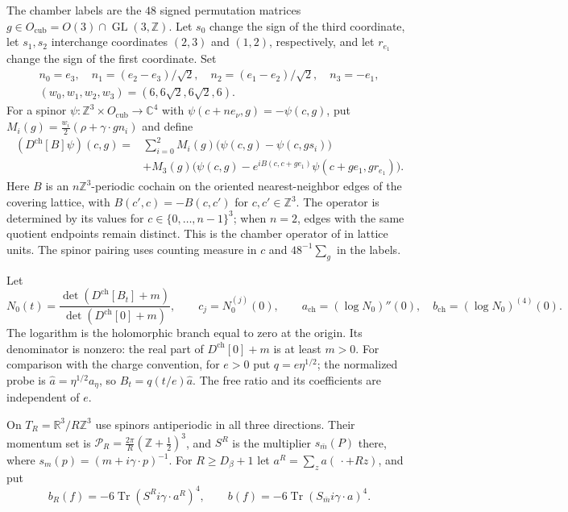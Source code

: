 \documentclass[11pt,letterpaper,reqno]{amsart}
\newcommand{\R}{\mathbb R}
\newcommand{\C}{\mathbb C}
\newcommand{\Z}{\mathbb Z}
\begin{document}
The chamber labels are the $48$ signed permutation matrices
$g\in O_{\mathrm{cub}}=O(3)\cap\operatorname{GL}(3,\Z)$.
Let $s_0$ change the sign of the third coordinate, let $s_1,s_2$
interchange coordinates $(2,3)$ and $(1,2)$, respectively, and let
$r_{e_1}$ change the sign of the first coordinate. Set
\begin{gather*}
 n_0=e_3,\quad n_1=(e_2-e_3)/\sqrt2,\quad
 n_2=(e_1-e_2)/\sqrt2,\quad n_3=-e_1,\\
 (w_0,w_1,w_2,w_3)=(6,6\sqrt2,6\sqrt2,6).
\end{gather*}
For a spinor $\psi:\Z^3\times O_{\mathrm{cub}}\to\C^4$ with
$\psi(c+ne_\nu,g)=-\psi(c,g)$, put
$M_i(g)=\frac{w_i}{2}(\rho+\gamma\cdot gn_i)$ and define
\begin{equation}\label{eq:prm-chamber-operator}
\begin{split}
 (D^{\mathrm{ch}}[B]\psi)(c,g)
 ={}&\sum_{i=0}^2M_i(g)\bigl(\psi(c,g)-\psi(c,gs_i)\bigr)\\
 &+M_3(g)\bigl(\psi(c,g)
       -e^{iB(c,c+ge_1)}\psi(c+ge_1,gr_{e_1})\bigr).
\end{split}
\end{equation}
Here $B$ is an $n\Z^3$-periodic cochain on the oriented nearest-neighbor
edges of the covering lattice, with $B(c',c)=-B(c,c')$ for
$c,c'\in\Z^3$. The operator is determined by its values for
$c\in\{0,\ldots,n-1\}^3$; when $n=2$, edges with the same quotient
endpoints remain distinct. This is the chamber operator
of \cite[\S2]{ChamberLattice} in lattice units.
The spinor pairing uses counting measure in $c$ and
$48^{-1}\sum_g$ in the labels.

Let
\begin{equation}\label{eq:response-free-ratio}
 N_0(t)=\frac{\det(D^{\mathrm{ch}}[B_t]+m)}
                  {\det(D^{\mathrm{ch}}[0]+m)},\qquad
 c_j=N_0^{(j)}(0),\qquad
 a_{\mathrm{ch}}=(\log N_0)''(0),\quad
 b_{\mathrm{ch}}=(\log N_0)^{(4)}(0).
\end{equation}
The logarithm is the holomorphic branch equal to zero at the
origin. Its denominator is nonzero: the real part of
$D^{\mathrm{ch}}[0]+m$ is at least $m>0$. For comparison
with the charge convention, for $e>0$ put $q=e\eta^{1/2}$; the normalized
probe is $\widehat a=\eta^{1/2}a_\eta$, so
$B_t=q(t/e)\widehat a$. The free ratio and its coefficients
are independent of $e$.

On $T_R=\R^3/R\Z^3$ use spinors antiperiodic in all three directions.
Their momentum set is
$\mathcal P_R=\frac{2\pi}{R}(\Z+\frac12)^3$, and
$S^R$ is the multiplier $s_{\bar m}(P)$ there, where
$s_m(p)=(m+i\gamma\cdot p)^{-1}$. For
$R\ge D_\beta+1$ let $a^R=\sum_za(\,\cdot+Rz)$, and put
\begin{equation}\label{eq:response-continuum-fourth}
 b_R(f)=-6\operatorname{Tr}(S^Ri\gamma\cdot a^R)^4,
 \qquad b(f)=-6\operatorname{Tr}(S_{\bar m}i\gamma\cdot a)^4.
\end{equation}
\end{document}
